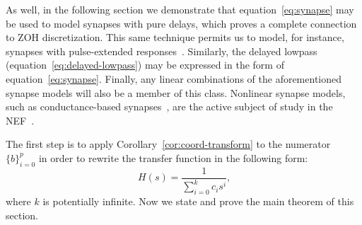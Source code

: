 As well, in the following section we demonstrate that equation~\ref{eq:synapse} may be used to model synapses with pure delays, which proves a complete connection to ZOH discretization.
This same technique permits us to model, for instance, synapses with pulse-extended responses~\citep{voelker2017iscas}.
Similarly, the delayed lowpass (equation~\ref{eq:delayed-lowpass}) may be expressed in the form of equation~\ref{eq:synapse}.
Finally, any linear combinations of the aforementioned synapse models will also be a member of this class.
Nonlinear synapse models, such as conductance-based synapses~\citep[e.g.,][equation~6]{destexhe1994efficient}, are the active subject of study in the NEF~\citep{stockel2017, stoeckel2018}.


The first step is to apply Corollary~\ref{cor:coord-transform} to the numerator $\{b\}_{i=0}^p$ in order to rewrite the transfer function in the following form:
\begin{equation} \label{eq:synapse-rewritten}
H(s) = \frac{1}{\sum_{i=0}^k c_i s^i} \text{,}
\end{equation}
where $k$ is potentially infinite. Now we state and prove the main theorem of this section.

